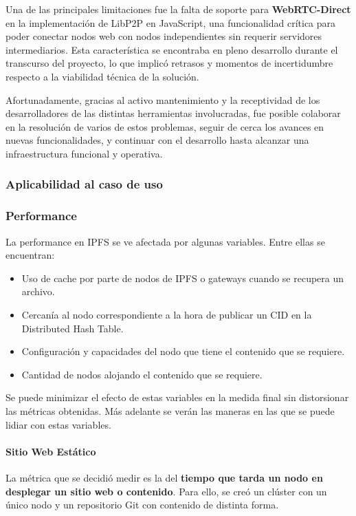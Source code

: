 Una de las principales limitaciones fue la falta de soporte para \textbf{WebRTC-Direct} en la implementación de LibP2P en JavaScript, una funcionalidad crítica para poder conectar nodos web con nodos independientes sin requerir servidores intermediarios. Esta característica se encontraba en pleno desarrollo durante el transcurso del proyecto, lo que implicó retrasos y momentos de incertidumbre respecto a la viabilidad técnica de la solución.

Afortunadamente, gracias al activo mantenimiento y la receptividad de los desarrolladores de las distintas herramientas involucradas, fue posible colaborar en la resolución de varios de estos problemas, seguir de cerca los avances en nuevas funcionalidades, y continuar con el desarrollo hasta alcanzar una infraestructura funcional y operativa.

\subsubsection{Aplicabilidad al caso de uso}

\subsubsection{Performance}

La performance en IPFS se ve afectada por algunas variables. Entre ellas se encuentran:

\begin{itemize}
    \item Uso de cache por parte de nodos de IPFS o gateways cuando se recupera un archivo.
    \item Cercanía al nodo correspondiente a la hora de publicar un CID en la Distributed Hash Table.
    \item Configuración y capacidades del nodo que tiene el contenido que se requiere.
    \item Cantidad de nodos alojando el contenido que se requiere.
\end{itemize}

 Se puede minimizar  el efecto de estas variables en la medida final sin distorsionar las métricas obtenidas. Más adelante se verán las maneras en las que se puede lidiar con estas variables.

\paragraph{Sitio Web Estático}
La métrica que se decidió medir es la del \textbf{tiempo que tarda un nodo en desplegar un sitio web o contenido}. Para ello, se creó un clúster con un único nodo y un repositorio Git con contenido de distinta forma.


